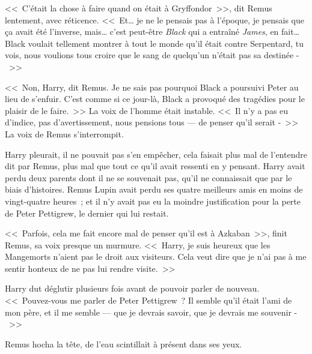 <<~C'était la chose à faire quand on était à Gryffondor~>>, dit Remus lentement, avec réticence. <<~Et… je ne le pensais pas à l'époque, je pensais que ça avait été l'inverse, mais… c'est peut-être \emph{Black} qui a entraîné \emph{James}, en fait… Black voulait tellement montrer à tout le monde qu'il était contre Serpentard, tu vois, nous voulions tous croire que le sang de quelqu'un n'était pas sa destinée -~>>

\later

<<~Non, Harry, dit Remus. Je ne sais pas pourquoi Black a poursuivi Peter au lieu de s'enfuir. C'est comme si ce jour-là, Black a provoqué des tragédies pour le plaisir de le faire.~>> La voix de l'homme était instable. <<~Il n'y a pas eu d'indice, pas d'avertissement, nous pensions tous — de penser qu'il serait -~>> La voix de Remus s'interrompit.

Harry pleurait, il ne pouvait pas s'en empêcher, cela faisait plus mal de l'entendre dit par Remus, plus mal que tout ce qu'il avait ressenti en y pensant. Harry avait perdu deux parents dont il ne se souvenait pas, qu'il ne connaissait que par le biais d'histoires. Remus Lupin avait perdu ses quatre meilleurs amis en moins de vingt-quatre heures~; et il n'y avait pas eu la moindre justification pour la perte de Peter Pettigrew, le dernier qui lui restait.

<<~Parfois, cela me fait encore mal de penser qu'il est à Azkaban~>>, finit Remus, sa voix presque un murmure. <<~Harry, je suis heureux que les Mangemorts n'aient pas le droit aux visiteurs. Cela veut dire que je n'ai pas à me sentir honteux de ne pas lui rendre visite.~>>

Harry dut déglutir plusieurs fois avant de pouvoir parler de nouveau. <<~Pouvez-vous me parler de Peter Pettigrew~? Il semble qu'il était l'ami de mon père, et il me semble — que je devrais savoir, que je devrais me souvenir -~>>

Remus hocha la tête, de l'eau scintillait à présent dans ses yeux.

